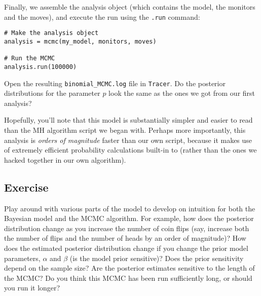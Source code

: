 Finally, we assemble the analysis object (which contains the model, the monitors and the moves), and execute the run using the \texttt{.run} command:
{\tt \begin{snugshade*}
\begin{lstlisting}    
# Make the analysis object
analysis = mcmc(my_model, monitors, moves)

# Run the MCMC
analysis.run(100000)
\end{lstlisting}
\end{snugshade*}}
Open the resulting \texttt{binomial\_MCMC.log} file in \texttt{Tracer}.
Do the posterior distributions for the parameter $p$ look the same as the ones we got from our first analysis?

Hopefully, you'll note that this \Rev model is substantially simpler and easier to read than the MH algorithm script we began with.
Perhaps more importantly, this \Rev analysis is \emph{orders of magnitude} faster than our own script, because it makes use of extremely efficient probability calculations built-in to \RevBayes (rather than the ones we hacked together in our own algorithm).

\subsection{Exercise}
Play around with various parts of the model to develop on intuition for both the Bayesian model and the MCMC algorithm.
For example, how does the posterior distribution change as you increase the number of coin flips (say, increase both the number of flips and the number of heads by an order of magnitude)?
How does the estimated posterior distribution change if you change the prior model parameters, $\alpha$ and $\beta$ (\IE is the model prior sensitive)?
Does the prior sensitivity depend on the sample size?
Are the posterior estimates sensitive to the length of the MCMC?
Do you think this MCMC has been run sufficiently long, or should you run it longer?












